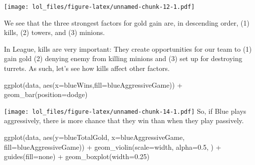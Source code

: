 \documentclass[
]{article}
\newenvironment{Shaded}{\begin{snugshade}}{\end{snugshade}}
\newcommand{\AttributeTok}[1]{\textcolor[rgb]{0.77,0.63,0.00}{#1}}
\newcommand{\FloatTok}[1]{\textcolor[rgb]{0.00,0.00,0.81}{#1}}
\newcommand{\FunctionTok}[1]{\textcolor[rgb]{0.00,0.00,0.00}{#1}}
\newcommand{\NormalTok}[1]{#1}
\newcommand{\OtherTok}[1]{\textcolor[rgb]{0.56,0.35,0.01}{#1}}
\newcommand{\SpecialCharTok}[1]{\textcolor[rgb]{0.00,0.00,0.00}{#1}}
\newcommand{\StringTok}[1]{\textcolor[rgb]{0.31,0.60,0.02}{#1}}
\begin{document}
\texttt{[image: lol\_files/figure-latex/unnamed-chunk-12-1.pdf]}

We see that the three strongest factors for gold gain are, in descending
order, (1) kills, (2) towers, and (3) minions.

In League, kills are very important: They create opportunities for our
team to (1) gain gold (2) denying enemy from killing minions and (3) set
up for destroying turrets. As such, let's see how kills affect other
factors.

\begin{Shaded}
\end{Shaded}

\begin{Shaded}
\begin{Highlighting}[]
\FunctionTok{ggplot}\NormalTok{(data, }\FunctionTok{aes}\NormalTok{(}\AttributeTok{x=}\NormalTok{blueWins,}\AttributeTok{fill=}\NormalTok{blueAggressiveGame)) }\SpecialCharTok{+} 
  \FunctionTok{geom\_bar}\NormalTok{(}\AttributeTok{position=}\StringTok{\textquotesingle{}dodge\textquotesingle{}}\NormalTok{)}
\end{Highlighting}
\end{Shaded}

\texttt{[image: lol\_files/figure-latex/unnamed-chunk-14-1.pdf]} So, if
Blue plays aggressively, there is more chance that they win than when
they play passively.

\begin{Shaded}
\begin{Highlighting}[]
\FunctionTok{ggplot}\NormalTok{(data, }\FunctionTok{aes}\NormalTok{(}\AttributeTok{y=}\NormalTok{blueTotalGold, }\AttributeTok{x=}\NormalTok{blueAggressiveGame, }\AttributeTok{fill=}\NormalTok{blueAggressiveGame)) }\SpecialCharTok{+} 
  \FunctionTok{geom\_violin}\NormalTok{(}\AttributeTok{scale=}\StringTok{\textquotesingle{}width\textquotesingle{}}\NormalTok{, }\AttributeTok{alpha=}\FloatTok{0.5}\NormalTok{, ) }\SpecialCharTok{+}
  \FunctionTok{guides}\NormalTok{(}\AttributeTok{fill=}\StringTok{\textquotesingle{}none\textquotesingle{}}\NormalTok{) }\SpecialCharTok{+} 
  \FunctionTok{geom\_boxplot}\NormalTok{(}\AttributeTok{width=}\FloatTok{0.25}\NormalTok{)}
\end{Highlighting}
\end{Shaded}
\end{document}
